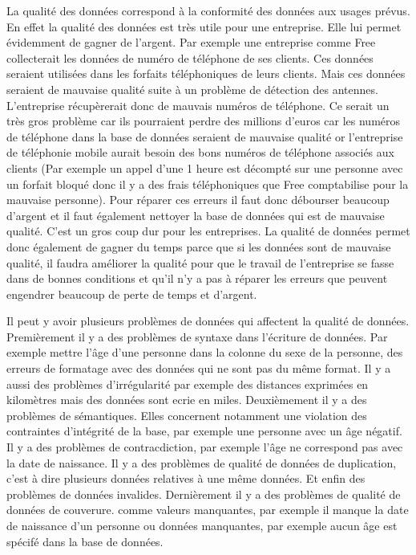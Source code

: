 \documentclass[12pt, openany]{article}
\begin{document}
La qualité des données correspond à la conformité des données aux usages prévus. En effet la qualité des données est très utile pour une entreprise. Elle lui permet évidemment de gagner de l'argent. Par exemple une entreprise comme Free collecterait les données de numéro de téléphone de ses clients. Ces données seraient utilisées dans les forfaits téléphoniques de leurs clients. Mais ces données seraient de mauvaise qualité suite à un problème de détection des antennes. L'entreprise récupèrerait donc de mauvais numéros de téléphone. Ce serait un très gros problème car ils pourraient perdre des millions d'euros car les numéros de téléphone dans la base de données seraient de mauvaise qualité or l'entreprise de téléphonie mobile aurait besoin des bons numéros de téléphone associés aux clients (Par exemple un appel d'une 1 heure est décompté sur une personne avec un forfait bloqué donc il y a des frais téléphoniques que Free comptabilise pour la mauvaise personne). Pour réparer ces erreurs il faut donc débourser beaucoup d'argent et il faut également nettoyer la base de données qui est de mauvaise qualité. C'est un gros coup dur pour les entreprises. La qualité de données permet donc également de gagner du temps parce que si les données sont de mauvaise qualité, il faudra améliorer la qualité pour que le travail de l'entreprise se fasse dans de bonnes conditions et qu'il n'y a pas à réparer les erreurs que peuvent engendrer beaucoup de perte de temps et d'argent.

\bigskip
Il peut y avoir plusieurs problèmes de données qui affectent la qualité de données. 
Premièrement il y a des problèmes de syntaxe dans l'écriture de données. Par exemple mettre l'âge d'une personne dans la colonne du sexe de la personne, des erreurs de formatage avec des données qui ne sont pas du même format. Il y a aussi des problèmes d'irrégularité par exemple des distances exprimées en kilomètres mais des données sont ecrie en miles.
Deuxièmement il y a des problèmes de sémantiques.
Elles concernent notamment une violation des contraintes d'intégrité de la base, par exemple une personne avec un âge négatif.
Il y a des problèmes de contracdiction, par exemple l'âge ne correspond pas avec la date de naissance.
Il y a des problèmes de qualité de données de duplication, c'est à dire plusieurs données relatives à une même données.
Et enfin des problèmes de données invalides.
Dernièrement il y a des problèmes de qualité de données de couverure.
comme valeurs manquantes, par exemple il manque la date de naissance d'un personne ou données manquantes, par exemple aucun âge est spécifé dans la base de données.
\end{document}
